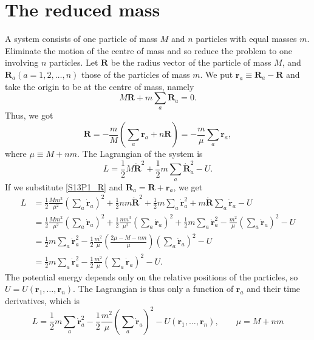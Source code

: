 \section{The reduced mass}


\begin{problem}[title={Centre of mass of one heavy and n particles}]
{
A system consists of one particle of mass $M$ and $n$ particles with equal masses $m$. Eliminate the motion of the centre of mass and so reduce the problem to one involving $n$ particles.
}
{
Let $\mathbf{R}$ be the radius vector of the particle of mass $M$, and $\mathbf{R}_a \left( a=1, 2, \ldots, n \right)$ those of the particles of mass $m$. We put $\mathbf{r}_a \equiv \mathbf{R}_a - \mathbf{R}$ and take the origin to be at the centre of mass, namely
\begin{equation*}
    M\mathbf{R} + m\sum_a \mathbf{R}_a = 0.
\end{equation*}
Thus, we got
\begin{equation} \label{S13P1_R}
    \mathbf{R} = -\frac{m}{M}\left(\sum_a\mathbf{r}_a + n\mathbf{R}\right) = -\frac{m}{\mu} \sum_a \mathbf{r}_a,
\end{equation}
where $\mu \equiv M + nm$. The Lagrangian of the system is
\begin{equation*}
    L = \frac{1}{2}M\Dot{\mathbf{R}}^2 + \frac{1}{2}m\sum_a\Dot{\mathbf{R}}_a^2 - U.
\end{equation*}
If we substitute \eqref{S13P1_R} and $\mathbf{R}_a = \mathbf{R} + \mathbf{r}_a$, we get
\begin{align*}
    L &= \frac{1}{2}\frac{Mm^2}{\mu^2} \left( \sum_a \Dot{\mathbf{r}}_a \right)^2 + \frac{1}{2}nm\Dot{\mathbf{R}}^2 + \frac{1}{2}m\sum_a\Dot{\mathbf{r}}_a^2 + m\Dot{\mathbf{R}}\sum_a \Dot{\mathbf{r}}_a - U \\
    &= \frac{1}{2}\frac{Mm^2}{\mu^2} \left( \sum_a \Dot{\mathbf{r}}_a \right)^2 + \frac{1}{2}\frac{nm^3}{\mu^2}\left( \sum_a \Dot{\mathbf{r}}_a \right)^2 + \frac{1}{2}m\sum_a\Dot{\mathbf{r}}_a^2 - \frac{m^2}{\mu}\left(\sum_a \Dot{\mathbf{r}}_a\right)^2 - U \\
    &= \frac{1}{2}m\sum_a\Dot{\mathbf{r}}_a^2 - \frac{1}{2}\frac{m^2}{\mu}\left( \frac{2\mu-M-nm}{\mu} \right)\left(\sum_a \Dot{\mathbf{r}}_a\right)^2 - U \\
    &= \frac{1}{2}m\sum_a\Dot{\mathbf{r}}_a^2 - \frac{1}{2}\frac{m^2}{\mu}\left(\sum_a \Dot{\mathbf{r}}_a\right)^2 - U.
\end{align*}
The potential energy depends only on the relative positions of the particles, so $U = U(\mathbf{r}_1, \ldots, \mathbf{r}_n)$. The Lagrangian is thus only a function of $\mathbf{r}_a$ and their time derivatives, which is
}
{
\begin{equation*}
    L = \frac{1}{2}m\sum_a\Dot{\mathbf{r}}_a^2 - \frac{1}{2}\frac{m^2}{\mu}\left(\sum_a \Dot{\mathbf{r}}_a\right)^2 - U(\mathbf{r}_1, \ldots, \mathbf{r}_n), \qquad \mu = M + nm
\end{equation*}
}
\end{problem}

